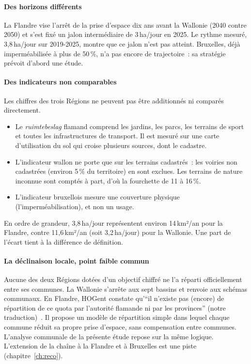 \documentclass[11pt,a4paper]{report}
\newcommand{\kmdan}{\,km²/an}
\begin{document}
\paragraph{Des horizons différents} La Flandre vise l'arrêt de la prise d'espace dix ans avant la Wallonie (2040 contre 2050) et s'est fixé un jalon intermédiaire de 3\,ha/jour en 2025. Le rythme mesuré, 3,8\,ha/jour sur 2019-2025, montre que ce jalon n'est pas atteint. Bruxelles, déjà imperméabilisée à plus de 50\,\%, n'a pas encore de trajectoire~: sa stratégie prévoit d'abord une étude.

\paragraph{Des indicateurs non comparables} Les chiffres des trois Régions ne peuvent pas être additionnés ni comparés directement.
\begin{itemize}
\item Le \emph{ruimtebeslag} flamand comprend les jardins, les parcs, les terrains de sport et toutes les infrastructures de transport. Il est mesuré sur une carte d'utilisation du sol qui croise plusieurs sources, dont le cadastre.
\item L'indicateur wallon ne porte que sur les terrains cadastrés~: les voiries non cadastrées (environ 5\,\% du territoire) en sont exclues. Les terrains de nature inconnue sont comptés à part, d'où la fourchette de 11 à 16\,\%.
\item L'indicateur bruxellois mesure une couverture physique (l'imperméabilisation), et non un usage.
\end{itemize}
En ordre de grandeur, 3,8\,ha/jour représentent environ 14\kmdan{} pour la Flandre, contre 11,6\kmdan{} (soit 3,2\,ha/jour) pour la Wallonie. Une part de l'écart tient à la différence de définition.

\paragraph{La déclinaison locale, point faible commun} Aucune des deux Régions dotées d'un objectif chiffré ne l'a réparti officiellement entre ses communes. La Wallonie s'arrête aux sept bassins et renvoie aux schémas communaux. En Flandre, HOGent constate qu'\enquote{il n'existe pas (encore) de répartition de ce quota par l'autorité flamande ni par les provinces} (notre traduction)~\citep{betonmeter2025}. Il propose un modèle de répartition simple dans lequel chaque commune réduit sa propre prise d'espace, sans compensation entre communes. L'analyse communale de la présente étude repose sur la même logique. L'extension de la chaîne à la Flandre et à Bruxelles est une piste (chapitre~\ref{ch:reco}).
\end{document}
